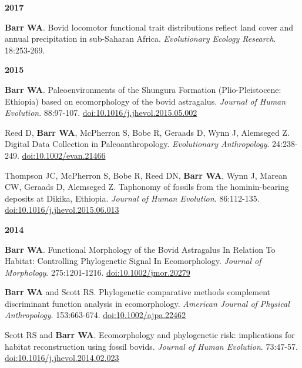 \documentclass{article}
\begin{document}
\begin{description*}
\item[] {\bfseries 2017}
\item[] {\bfseries Barr WA}. Bovid locomotor functional trait distributions reflect land cover and annual precipitation in sub-Saharan Africa. \emph{Evolutionary Ecology Research}. 18:253-269.
\end{description*}

\begin{description*}
\item[] {\bfseries 2015}
\item[] {\bfseries Barr WA}. Paleoenvironments of the Shungura Formation (Plio-Pleistocene: Ethiopia) based on ecomorphology of the bovid astragalus. \emph{Journal of Human Evolution}. 88:97-107. \href{http://dx.doi.org/10.1016/j.jhevol.2015.05.002}{doi:10.1016/j.jhevol.2015.05.002}
\item Reed D, {\bfseries Barr WA}, McPherron S, Bobe R, Geraads D, Wynn J, Alemseged Z. Digital Data Collection in Paleoanthropology. \emph{Evolutionary Anthropology}. 24:238-249. \href{http://dx.doi.org/10.1002/evan.21466}{doi:10.1002/evan.21466}
\item[] Thompson JC, McPherron S, Bobe R, Reed DN, {\bfseries Barr WA}, Wynn J, Marean CW, Geraads D, Alemseged Z. Taphonomy of fossils from the hominin-bearing deposits at Dikika, Ethiopia. \emph{Journal of Human Evolution}. 86:112-135. \href{http://dx.doi.org/10.1016/j.jhevol.2015.06.013}{doi:10.1016/j.jhevol.2015.06.013}


\end{description*}

\begin{description*}
\item[] {\bfseries 2014}
\item[] {\bfseries Barr WA}. Functional Morphology of the Bovid Astragalus In Relation To Habitat: Controlling Phylogenetic Signal In Ecomorphology. \emph{Journal
of Morphology}. 275:1201-1216. \href{http://dx.doi.org/10.1002/jmor.20279}{doi:10.1002/jmor.20279}

\item[] {\bfseries Barr WA} and Scott RS. Phylogenetic comparative methods complement discriminant function analysis in ecomorphology. \emph{American Journal
of Physical Anthropology}. 153:663-674. \href{http://dx.doi.org/10.1002/ajpa.22462}{doi:10.1002/ajpa.22462}

\item[] Scott RS and {\bfseries Barr WA}. Ecomorphology and phylogenetic risk: implications for habitat reconstruction using fossil bovids.
\emph{Journal of Human Evolution}. 73:47-57. \href{http://dx.doi.org/10.1016/j.jhevol.2014.02.023}{doi:10.1016/j.jhevol.2014.02.023}

\end{description*}
\end{document}
